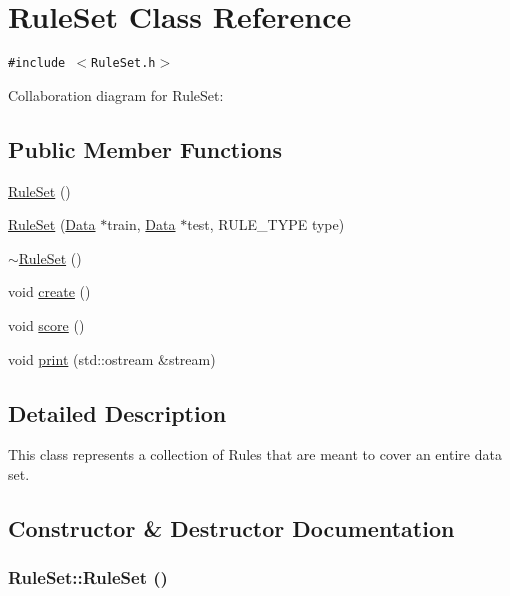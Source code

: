 \hypertarget{class_rule_set}{
\section{RuleSet Class Reference}
\label{class_rule_set}
}
{\tt \#include $<$RuleSet.h$>$}

Collaboration diagram for RuleSet:\subsection*{Public Member Functions}
\begin{CompactItemize}
\item 
\hyperlink{class_rule_set_db76582d86e9454d1918dba7dde54278}{RuleSet} ()
\item 
\hyperlink{class_rule_set_ade3c40c3566785015423b68ec231610}{RuleSet} (\hyperlink{class_data}{Data} $\ast$train, \hyperlink{class_data}{Data} $\ast$test, RULE\_\-TYPE type)
\item 
\hyperlink{class_rule_set_65703491de0805010c2deda1ee12cd4f}{$\sim$RuleSet} ()
\item 
void \hyperlink{class_rule_set_a97d52f89a230fe24426c264daf28e9a}{create} ()
\item 
void \hyperlink{class_rule_set_303fc2e6ff151614cf3b3695bab76cf3}{score} ()
\item 
void \hyperlink{class_rule_set_f2924a75e022901e54f248d380c97944}{print} (std::ostream \&stream)
\end{CompactItemize}


\subsection{Detailed Description}
This class represents a collection of Rules that are meant to cover an entire data set. 

\subsection{Constructor \& Destructor Documentation}
\hypertarget{class_rule_set_db76582d86e9454d1918dba7dde54278}{
\subsubsection{\setlength{\rightskip}{0pt plus 5cm}RuleSet::RuleSet ()}}
\label{class_rule_set_db76582d86e9454d1918dba7dde54278}


